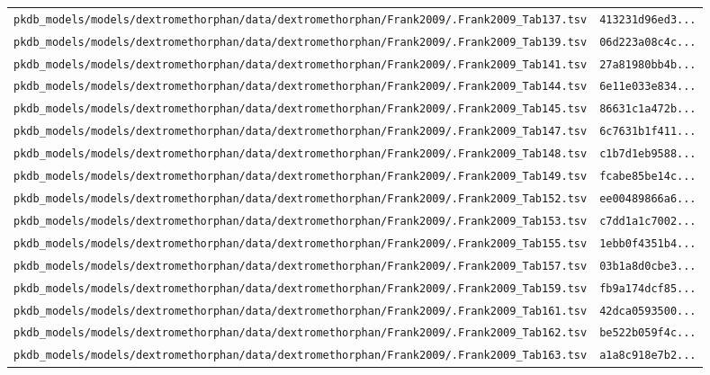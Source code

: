 \begin{longtable}{ll}
\texttt{pkdb\_models/models/dextromethorphan/data/dextromethorphan/Frank2009/.Frank2009\_Tab137.tsv} & \texttt{413231d96ed3...} \\
\texttt{pkdb\_models/models/dextromethorphan/data/dextromethorphan/Frank2009/.Frank2009\_Tab139.tsv} & \texttt{06d223a08c4c...} \\
\texttt{pkdb\_models/models/dextromethorphan/data/dextromethorphan/Frank2009/.Frank2009\_Tab141.tsv} & \texttt{27a81980bb4b...} \\
\texttt{pkdb\_models/models/dextromethorphan/data/dextromethorphan/Frank2009/.Frank2009\_Tab144.tsv} & \texttt{6e11e033e834...} \\
\texttt{pkdb\_models/models/dextromethorphan/data/dextromethorphan/Frank2009/.Frank2009\_Tab145.tsv} & \texttt{86631c1a472b...} \\
\texttt{pkdb\_models/models/dextromethorphan/data/dextromethorphan/Frank2009/.Frank2009\_Tab147.tsv} & \texttt{6c7631b1f411...} \\
\texttt{pkdb\_models/models/dextromethorphan/data/dextromethorphan/Frank2009/.Frank2009\_Tab148.tsv} & \texttt{c1b7d1eb9588...} \\
\texttt{pkdb\_models/models/dextromethorphan/data/dextromethorphan/Frank2009/.Frank2009\_Tab149.tsv} & \texttt{fcabe85be14c...} \\
\texttt{pkdb\_models/models/dextromethorphan/data/dextromethorphan/Frank2009/.Frank2009\_Tab152.tsv} & \texttt{ee00489866a6...} \\
\texttt{pkdb\_models/models/dextromethorphan/data/dextromethorphan/Frank2009/.Frank2009\_Tab153.tsv} & \texttt{c7dd1a1c7002...} \\
\texttt{pkdb\_models/models/dextromethorphan/data/dextromethorphan/Frank2009/.Frank2009\_Tab155.tsv} & \texttt{1ebb0f4351b4...} \\
\texttt{pkdb\_models/models/dextromethorphan/data/dextromethorphan/Frank2009/.Frank2009\_Tab157.tsv} & \texttt{03b1a8d0cbe3...} \\
\texttt{pkdb\_models/models/dextromethorphan/data/dextromethorphan/Frank2009/.Frank2009\_Tab159.tsv} & \texttt{fb9a174dcf85...} \\
\texttt{pkdb\_models/models/dextromethorphan/data/dextromethorphan/Frank2009/.Frank2009\_Tab161.tsv} & \texttt{42dca0593500...} \\
\texttt{pkdb\_models/models/dextromethorphan/data/dextromethorphan/Frank2009/.Frank2009\_Tab162.tsv} & \texttt{be522b059f4c...} \\
\texttt{pkdb\_models/models/dextromethorphan/data/dextromethorphan/Frank2009/.Frank2009\_Tab163.tsv} & \texttt{a1a8c918e7b2...} \\

\end{longtable}
